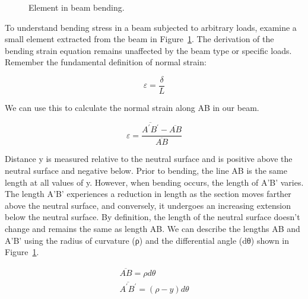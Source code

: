 \documentclass[
  letterpaper,
  DIV=11,
  numbers=noendperiod]{scrreprt}
\theoremstyle{definition}
\theoremstyle{remark}
\begin{document}
\begin{figure}


\caption{\label{fig-9.6}Element in beam bending.}

\end{figure}%

To understand bending stress in a beam subjected to arbitrary loads,
examine a small element extracted from the beam in Figure~\ref{fig-9.6}.
The derivation of the bending strain equation remains unaffected by the
beam type or specific loads. Remember the fundamental definition of
normal strain:

\[
\varepsilon=\frac{\delta}{L}
\]

We can use this to calculate the normal strain along AB in our beam.

\[
\varepsilon=\frac{\overline{A^{\prime} B^{\prime}}-\overline{A B}}{\overline{A B}}
\]

Distance y is measured relative to the neutral surface and is positive
above the neutral surface and negative below. Prior to bending, the line
AB is the same length at all values of y. However, when bending occurs,
the length of A'B' varies. The length A'B' experiences a reduction in
length as the section moves farther above the neutral surface, and
conversely, it undergoes an increasing extension below the neutral
surface. By definition, the length of the neutral surface doesn't change
and remains the same as length AB. We can describe the lengths AB and
A'B' using the radius of curvature (ρ) and the differential angle (dθ)
shown in Figure~\ref{fig-9.6}.

\[
\begin{gathered}
\overline{A B}=\rho d \theta \\
\overline{A^{\prime} B^{\prime}}=(\rho-y) d \theta
\end{gathered}
\]
\end{document}
